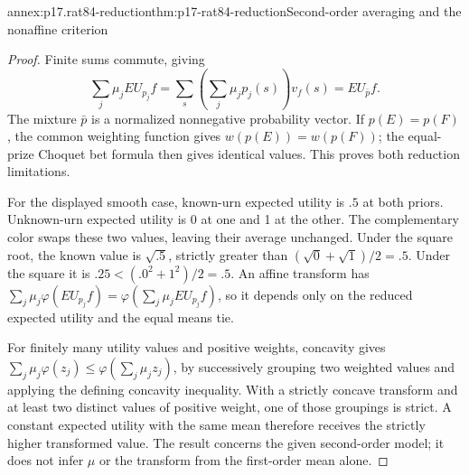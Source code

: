 \begin{annexitem}{annex:p17.rat84-reduction}{thm:p17-rat84-reduction}{Second-order averaging and the nonaffine criterion}
\begin{proof}
Finite sums commute, giving
\[
 \sum_j\mu_jEU_{p_j}f
 =\sum_s\left(\sum_j\mu_jp_j(s)\right)v_f(s)
 =EU_{\bar p}f.
\]
The mixture \(\bar p\) is a normalized nonnegative
probability vector. If \(p(E)=p(F)\), the common weighting
function gives \(w(p(E))=w(p(F))\); the equal-prize
Choquet bet formula then gives identical values. This
proves both reduction limitations.

For the displayed smooth case, known-urn expected utility
is \(.5\) at both priors. Unknown-urn expected utility
is 0 at one and 1 at the other. The complementary
color swaps these two values, leaving their average
unchanged. Under the square root, the known value is
\(\sqrt{.5}\), strictly greater than
\((\sqrt0+\sqrt1)/2=.5\). Under the square it is
\(.25<(.0^2+1^2)/2=.5\). An affine transform has
\(\sum_j\mu_j\varphi(EU_{p_j}f)
=\varphi(\sum_j\mu_jEU_{p_j}f)\), so it depends only
on the reduced expected utility and the equal means tie.

For finitely many utility values and positive weights,
concavity gives
\(\sum_j\mu_j\varphi(z_j)\leq
\varphi(\sum_j\mu_jz_j)\), by successively grouping
two weighted values and applying the defining concavity
inequality. With a strictly concave transform and at
least two distinct values of positive weight, one of
those groupings is strict. A constant expected utility
with the same mean therefore receives the strictly
higher transformed value. The result concerns the
given second-order model; it does not infer \(\mu\)
or the transform from the first-order mean alone.
\end{proof}
\end{annexitem}
